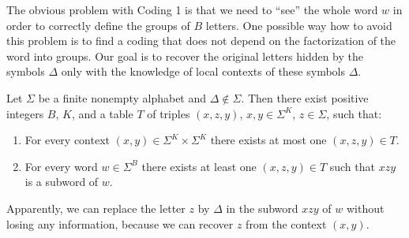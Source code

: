 The obvious problem with Coding 1 is that we need to ``see'' the whole word $w$ in order to correctly define the groups of $B$ letters. One possible way how to avoid this problem is to find a coding that does not depend on the factorization of the word into groups. Our goal is to recover the original letters hidden by the symbols $\Delta$ only with the knowledge of local contexts of these symbols $\Delta$.

\begin{theorem}[Coding 2]\label{theorem:dxclra_coding_2}
Let $\Sigma$ be a finite nonempty alphabet and $\Delta \notin \Sigma$. Then there exist positive integers $B$, $K$, and a table $T$ of triples $(x, z, y)$, $x, y \in \Sigma^K$, $z \in \Sigma$, such that:
\begin{enumerate}
\item\label{theorem:dxclra_coding_2:a}
For every context $(x, y) \in \Sigma^K \times \Sigma^K$ there exists at most one $(x, z, y) \in T$.
\item\label{theorem:dxclra_coding_2:b} For every word $w \in \Sigma^B$ there exists at least one $(x, z, y) \in T$ such that $xzy$ is a subword of $w$.
\end{enumerate}
\end{theorem}

Apparently, we can replace the letter $z$ by $\Delta$ in the subword $xzy$ of $w$ without losing any information, because we can recover $z$ from the context $(x, y)$.

